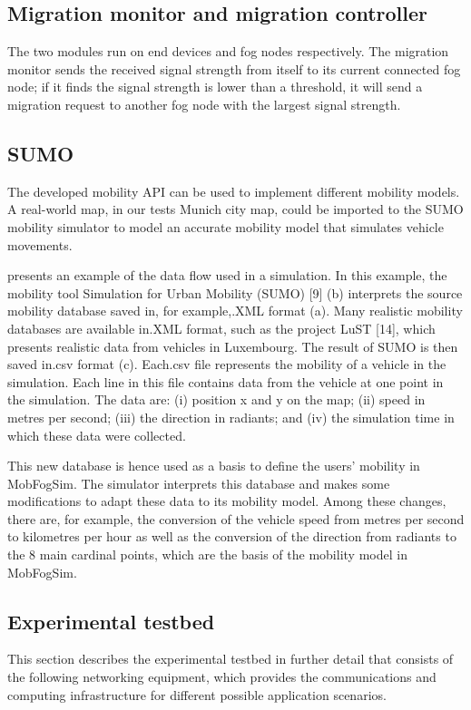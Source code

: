 \documentclass[conference]{IEEEtran}
\begin{document}
\subsection{Migration monitor and migration controller}
The two modules run on end devices and fog
nodes respectively. The migration monitor sends the received signal strength from itself to its current
connected fog node; if it finds the signal strength is lower than a threshold, it will send a migration
request to another fog node with the largest signal strength.

\subsection{SUMO}
\par The developed mobility API can be used to implement different mobility models. A real-world map, in our tests Munich city map, could be imported to the SUMO mobility simulator to model an accurate mobility model that simulates vehicle movements. 

\par presents an example of the data flow used in a simulation. In this example, the mobility tool Simulation for Urban Mobility (SUMO) [9] (b) interprets the source mobility database saved in, for example,.XML format (a). Many realistic mobility databases are available in.XML format, such as the project LuST [14], which presents realistic data from vehicles in Luxembourg. The result of SUMO is then saved in.csv format (c).
Each.csv file represents the mobility of a vehicle in the simulation. Each line in this file contains data from the vehicle at one point in the simulation. The data are: (i) position x and y on the map; (ii) speed in metres per second; (iii) the direction in radiants; and (iv) the simulation time in which these data were collected.

This new database is hence used as a basis to define the users’ mobility in MobFogSim. The simulator interprets this database and makes some modifications to adapt these data to its mobility model. Among these changes, there are, for example, the conversion of the vehicle speed from metres per second to kilometres per hour as well as the conversion of the direction from radiants to the 8 main cardinal points, which are the basis of the mobility model in MobFogSim.

\subsection{Experimental testbed}
\par This section describes the experimental testbed in further detail that consists of the following networking equipment, which provides the communications and computing infrastructure for different possible application scenarios.
\end{document}
